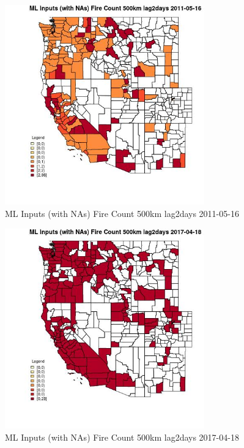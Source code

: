 \begin{figure} 
\centering  
\includegraphics[width=0.77\textwidth]{Code_Outputs/Report_ML_input_PM25_Step4_part_e_de_duplicated_aves_compiled_2019-05-20wNAs_CountyFire_Count_500km_lag2daysMean2011-05-16.jpg} 
\caption{\label{fig:Report_ML_input_PM25_Step4_part_e_de_duplicated_aves_compiled_2019-05-20wNAsCountyFire_Count_500km_lag2daysMean2011-05-16}ML Inputs (with NAs) Fire Count 500km lag2days 2011-05-16} 
\end{figure} 
 

\begin{figure} 
\centering  
\includegraphics[width=0.77\textwidth]{Code_Outputs/Report_ML_input_PM25_Step4_part_e_de_duplicated_aves_compiled_2019-05-20wNAs_CountyFire_Count_500km_lag2daysMean2017-04-18.jpg} 
\caption{\label{fig:Report_ML_input_PM25_Step4_part_e_de_duplicated_aves_compiled_2019-05-20wNAsCountyFire_Count_500km_lag2daysMean2017-04-18}ML Inputs (with NAs) Fire Count 500km lag2days 2017-04-18} 
\end{figure} 
 

